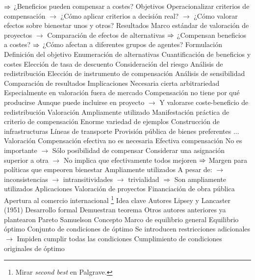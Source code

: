 \documentclass{nuevotema}
\begin{document}
\begin{esquemal}
				\4[] $\Rightarrow$ ¿Beneficios pueden compensar a costes?
				\4 Objetivos
				\4[] Operacionalizar criterios de compensación
				\4[] $\to$ ¿Cómo aplicar criterios a decisión real?
				\4[] $\to$ ¿Cómo valorar efectos sobre bienestar unos y otros?
				\4 Resultados
				\4[] Marco estándar de valoración de proyectos
				\4[] $\to$ Comparación de efectos de alternativas
				\4[] $\Rightarrow$ ¿Compensan beneficios a costes?
				\4[] $\Rightarrow$ ¿Cómo afectan a diferentes grupos de agentes?
			\3 Formulación
				\4[I] Definición del objetivo
				\4[II] Enumeración de alternativas
				\4[III] Cuantificación de beneficios y costes
				\4[IV] Elección de tasa de descuento
				\4[V] Consideración del riesgo
				\4[VI] Análisis de redistribución
				\4[VII] Elección de instrumento de compensación
				\4[VIII] Análisis de sensibilidad
				\4[IX] Comparación de resultados
			\3 Implicaciones
				\4 Necesaria cierta arbitrariedad
				\4[] Especialmente en valoración fuera de mercado
				\4 Compensación no tiene por qué producirse
				\4[] Aunque puede incluirse en proyecto
				\4[] $\to$ Y valorarse coste-beneficio de redistribución
			\3 Valoración
				\4 Ampliamente utilizado
				\4 Manifestación práctica de criterio de compensación
				\4 Enorme variedad de ejemplos
				\4[] Construcción de infrastructuras
				\4[] Líneas de transporte
				\4[] Provisión pública de bienes preferentes
				\4[] ...
		\2 Valoración
			\3 Compensación efectiva no es necesaria
				\4 Efectiva compensación
				\4[] No es importante
				\4[] $\to$ Sólo posibilidad de compensar
				\4 Considerar una asignación superior a otra
				\4[] $\to$ No implica que efectivamente todos mejoren
				\4[] $\Rightarrow$ Margen para políticas que empeoren bienestar
			\3 Ampliamente utilizados
				\4 A pesar de:
				\4[] $\to$ inconsistencias
				\4[] $\to$ intransitividades
				\4[] $\to$ trivialidad
				\4[] $\Rightarrow$ Son ampliamente utilizados
				\4 Aplicaciones
				\4[] Valoración de proyectos
				\4[] Financiación de obra pública
				\4[] Apertura al comercio internacional
	\1 \footnote{Mirar \textit{second best} en Palgrave.}
		\2 Idea clave
			\3 Autores
				\4 Lipsey y Lancaster (1951)
				\4[] Desarrollo formal
				\4[] Demuestran teorema
				\4 Otros autores anteriores ya plantearon
				\4[] Pareto
				\4[] Samuelson
			\3 Concepto
				\4 Marco de equilibrio general
				\4 Equilibrio óptimo
				\4[] Conjunto de condiciones de óptimo
				\4 Se introducen restricciones adicionales
				\4[] $\to$ Impiden cumplir todas las condiciones
				\4 Cumplimiento de condiciones originales de óptimo

\end{esquemal}
\end{document}
